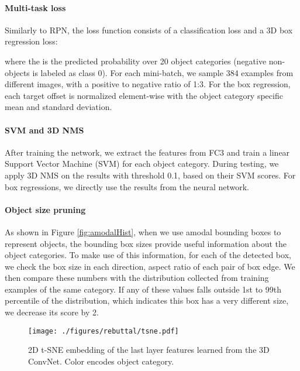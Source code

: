 \documentclass[10pt,twocolumn,letterpaper]{article}
\begin{document}
\vspace{-4mm}\paragraph{Multi-task loss}
Similarly to RPN, 
the loss function consists of a classification loss and a 3D box regression loss: 
\vspace{-1mm}

where the  is the predicted probability over 20 object categories (negative non-objects is labeled as class 0).
For each mini-batch, 
we sample 384 examples from different images, with a positive to negative ratio of 1:3.
For the box regression,
each target offset  is normalized element-wise with the object category specific mean and standard deviation. 

\vspace{-4mm}\paragraph{SVM and 3D NMS}
After training the network,
we extract the features from FC3 and train a linear Support Vector Machine (SVM) for each object category. 
During testing, we apply 3D NMS on the results with threshold 0.1, based on their SVM scores.
For box regressions, we directly use the results from the neural network.


\vspace{-4mm}\paragraph{Object size pruning}
As shown in Figure \ref{fig:amodalHist}, when we use amodal bounding boxes to represent objects, the bounding box sizes provide useful information about the object categories. 
To make use of this information, for each of the detected box, 
we check the box size in each direction, aspect ratio of each pair of box edge. We then compare these numbers with the distribution collected from training examples of the same category. 
If any of these values falls outside 1st to 99th percentile of the distribution, which indicates this box has a very different size,
we decrease its score by 2. 


\begin{figure}[t]
    \centering
    \texttt{[image: ./figures/rebuttal/tsne.pdf]}
    \caption{2D t-SNE embedding of the last layer features learned from the 3D ConvNet. Color encodes object category.}
    \label{fig:t-sne}
     \vspace{-3mm}
\end{figure}
\end{document}
